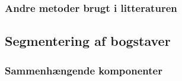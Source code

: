 \subsubsection*{Andre metoder brugt i litteraturen}

\subsection{Segmentering af bogstaver}

\subsubsection*{Sammenhængende komponenter}
\begin{comment}
Denne metode er bygget op omkring sammenhængende komponenter. Ideén bygger på at de 7 tegn som findes i billedet af nummerpladen alle er forbunde komponenter og derfor vil fremstå efter en forbundne komponenter-analyse. Andre dele af billedet vil højst sandsynligt også være ..



For at tegnene i nummerpladen skal udskille sig klart fra den hvide baggrund (pladen kan være beskidt, lyset på billedet kan være dårligt etc.) er det nødvendigt at filtrere billedet af pladen. Først omdannes billedet til gråtone hvorefter der udføres henholdsvis en top-hat filtrering og en bottom-hat filtrering MERE OM HVAD DET ER. For at forstærke billedets kontraster lægges det top-hat filtrerede billede til original billedet hvorefter det bottom-hat filtrerede billede trækkes fra.

EKSEMPEL PÅ BILLEDE MED FORSTÆRKEDE KONTRASTER.

Herefter findes billedets sammenhængende komponenter ved brug af metoden bwLabel. Denne metode finder forbudne komponenter med værdien 1 i et binært billede, hvorfor metoden i denne situation bruges på det negerede binære billede.

EKSEMPEL PÅ OMVENDT BINÆRT BILLEDE

Som det ses på billedet i Figur ? er nummerpladens tegn ikke altid de eneste sammenhængende komponenter i billedet. Derfor er det nødvendigt at sortere flere af de sammenhængende komponenter fra udfra følgende overvejelser:


\end{comment}
